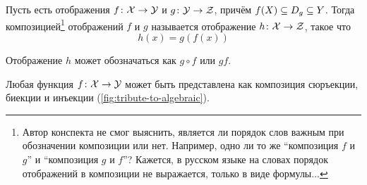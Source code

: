 \documentclass[a4paper,12pt]{article}
\begin{document}
  \begin{definition}
    Пусть есть отображения $f\colon \mathcal X \hm\to \mathcal Y$ и $g\colon \mathcal Y \hm\to \mathcal Z$, причём $f(X) \hm\subseteq D_g \hm\subseteq Y$.
    Тогда композицией\footnote{Автор конспекта не смог выяснить, является ли порядок слов важным при обозначении композиции или нет. Например, одно ли то же ``композиция $f$ и $g$'' и ``композиция $g$ и $f$''? Кажется, в русском языке на словах порядок отображений в композиции не выражается, только в виде формулы...} отображений $f$ и $g$ называется отображение $h\colon \mathcal X \hm\to \mathcal Z$, такое что
    \[
      h(x) = g(f(x))
    \]
    
    Отображение $h$ может обозначаться как $g\circ f$ или $gf$.
  \end{definition}

  \begin{theorem}
    Любая функция $f\colon \mathcal X \hm\to \mathcal Y$ может быть представлена как композиция сюръекции, биекции и инъекции (\ref{fig:tribute-to-algebraic}).
  \end{theorem}
  
\end{document}
